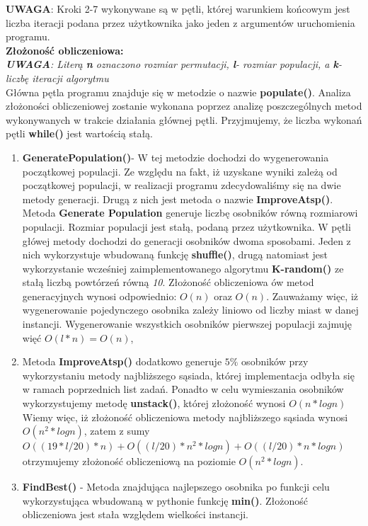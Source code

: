   \textbf{UWAGA}: Kroki 2-7 wykonywane są w pętli, której warunkiem końcowym jest liczba iteracji podana przez użytkownika jako jeden z argumentów uruchomienia programu. \\
 \textbf{Złożoność obliczeniowa: } \\
  \textit{\textbf{UWAGA}: Literą \textbf{n} oznaczono rozmiar permutacji, \textbf{l}- rozmiar populacji, a \textbf{k}- liczbę iteracji algorytmu} \\
  Główna pętla programu znajduje się w metodzie o nazwie \textbf{populate()}. Analiza złożoności obliczeniowej zostanie wykonana
  poprzez analizę poszczególnych metod wykonywanych w trakcie działania głównej pętli. Przyjmujemy, że liczba wykonań pętli \textbf{while()}
  jest wartością stałą.
  \begin{enumerate}
    \item \textbf{GeneratePopulation()}- W tej metodzie dochodzi do wygenerowania początkowej populacji. Ze względu na fakt,
    iż uzyskane wyniki zależą od początkowej populacji, w realizacji programu zdecydowaliśmy się na dwie metody generacji.
    Drugą z nich jest metoda o nazwie \textbf{ImproveAtsp()}. Metoda \textbf{Generate Population} generuje liczbę osobników równą rozmiarowi populacji. Rozmiar populacji jest stałą, podaną przez użytkownika.
    W pętli główej metody dochodzi do generacji osobników dwoma sposobami. Jeden z nich wykorzystuje wbudowaną funkcję \textbf{shuffle()}, drugą natomiast jest wykorzystanie wcześniej zaimplementowanego algorytmu
    \textbf{K-random()} ze stałą liczbą powtórzeń równą \textit{10}. Złożoność obliczeniowa ów metod generacyjnych wynosi odpowiednio: $O(n)$ oraz $O(n)$.
    Zauważamy więc, iż wygenerowanie pojedynczego osobnika zależy liniowo od liczby miast w danej instancji.
    Wygenerowanie wszystkich osobników pierwszej populacji zajmuję więć $O(l*n) = O(n)$,\\
    \item Metoda \textbf{ImproveAtsp()} dodatkowo generuje $5\%$ osobników przy wykorzystaniu metody najbliższego sąsiada, której implementacja odbyła się w ramach poprzednich list zadań. Ponadto w celu wymieszania osobników wykorzystujemy metodę \textbf{unstack()}, której złożoność wynosi $O(n*logn)$
    Wiemy więc, iż złożoność obliczeniowa metody najbliższego sąsiada wynosi $O(n^2*logn)$, zatem z sumy $O((19*l/20)*n) + O((l/20)*n^{2}*logn) + O((l/20)*n*logn)$ otrzymujemy złożoność obliczeniową na poziomie $O(n^{2}*logn)$.
    \item \textbf{FindBest()} - Metoda znajdująca najlepszego osobnika po funkcji celu wykorzystująca wbudowaną w pythonie funkcję \textbf{min()}. Złożoność obliczeniowa jest stała względem wielkości instancji.

\end{enumerate}
